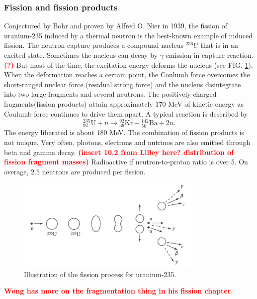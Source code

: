 \documentclass[preprint,aip,cha]{revtex4-1}
\newcommand{\red}[1]{\textcolor{red}{\bf #1}}
\begin{document}
        \subsubsection{Fission and fission products}
        Conjectured by Bohr and proven by Alfred O. Nier in 1939,
        the fission of uranium-235 induced by a thermal neutron
        is the best-known example of induced fission. 
        The neutron capture produces a compound nucleus ${}^{236}U$ that is in an excited state.
        Sometimes the nucleus can decay by $\gamma$ emission in capture reaction. \red{(?)}
        But most of the time, the excitation energy deforms the nucleus (see FIG. \ref{fig:fission}).
        When the
        deformation reaches a certain point, the Coulumb force overcomes the short-ranged nuclear
        force (residual strong force) and the nucleus disintegrate into two large fragments and several neutrons. The
        positively-charged fragments(fission products) attain approximately $170$ MeV of kinetic energy as
        Coulumb force continues to drive them apart.\cite{l01}
        A typical reaction is described by
        \[{}^{235}_{92}\text{U} + n \rightarrow {}^{92}_{36}\text{Kr} + {}^{142}_{56}\text{Ba} + 2 n.\]
        The energy liberated is about $180$ MeV. The combination of fission products is not
        unique. \cite{w98, gc01}
        Very often, photons, electrons and nutrinos are also emitted through beta and gamma decay.
        \red{(insert 10.2 from Lilley here? distribution of fission fragment masses)}
        Radioactive if neutron-to-proton ratio is over 5. On average, $2.5$ neutrons are produced per fission.\cite{l01} 
        \begin{figure}[h]
            \centering
            \includegraphics[width=0.8\textwidth]{fission.png}
            \caption{Illustration of the fission process for uranium-235.\cite{l01}}
            \label{fig:fission}
        \end{figure}

        \red{Wong has more on the fragmentation thing in his fission chapter.}
\end{document}

